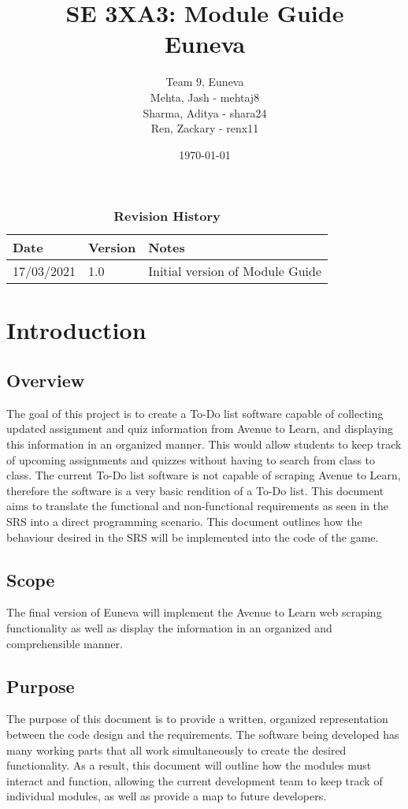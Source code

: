 \documentclass[12pt, titlepage]{article}
\title{SE 3XA3: Module Guide\\Euneva}
\author{Team 9, Euneva
		\\ Mehta, Jash - mehtaj8
		\\ Sharma, Aditya - shara24
		\\ Ren, Zackary - renx11
}
\date{\today}
\begin{document}
\maketitle

\tableofcontents
\listoftables
\listoffigures

\begin{table}[bp]
\caption{\bf Revision History}
\begin{tabularx}{\textwidth}{p{3cm}p{2cm}X}
\toprule {\bf Date} & {\bf Version} & {\bf Notes}\\
\midrule
17/03/2021 & 1.0 & Initial version of Module Guide\\
\bottomrule
\end{tabularx}
\end{table}

\newpage


\section{Introduction}

\subsection{Overview}
The goal of this project is to create a To-Do list software capable of collecting updated assignment and quiz information from Avenue to Learn, and displaying this information in an organized manner. This would allow students to keep track of upcoming assignments and quizzes without having to search from class to class. The current To-Do list software is not capable of scraping Avenue to Learn, therefore the software is a very basic rendition of a To-Do list. This document aims to translate the functional and non-functional requirements as seen in the SRS into a direct programming scenario. This document outlines how the behaviour desired in the SRS will be implemented into the code of the game.

\subsection{Scope}
The final version of Euneva will implement the Avenue to Learn web scraping functionality as well as display the information in an organized and comprehensible manner.

\subsection{Purpose}
The purpose of this document is to provide a written, organized representation between the code design and the requirements. The software being developed has many working parts that all work simultaneously to create the desired functionality. As a result, this document will outline how the modules must interact and function, allowing the current development team to keep track of individual modules, as well as provide a map to future developers.
\end{document}
